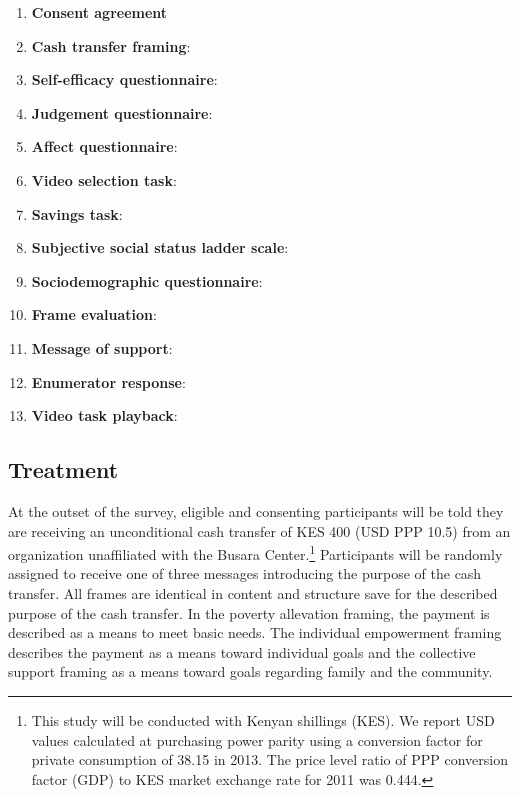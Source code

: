 \documentclass[11pt, a4paper]{article}\usepackage[]{graphicx}\usepackage[]{color}
\begin{document}
        \begin{enumerate}
            \item \textbf{Consent agreement}
            \item \textbf{Cash transfer framing}:
            \item \textbf{Self-efficacy questionnaire}:
            \item \textbf{Judgement questionnaire}:
            \item \textbf{Affect questionnaire}:
            \item \textbf{Video selection task}:
            \item \textbf{Savings task}:
            \item \textbf{Subjective social status ladder scale}:
            \item \textbf{Sociodemographic questionnaire}:
            \item \textbf{Frame evaluation}:
            \item \textbf{Message of support}:
            \item \textbf{Enumerator response}:
            \item \textbf{Video task playback}:
        \end{enumerate}

    \subsection{Treatment}

        At the outset of the survey, eligible and consenting participants will be told they are receiving an unconditional cash transfer of KES 400 (USD PPP 10.5) from an organization unaffiliated with the Busara Center.\footnote{This study will be conducted with Kenyan shillings (KES). We report USD values calculated at purchasing power parity using a conversion factor for private consumption of 38.15 in 2013. The price level ratio of PPP conversion factor (GDP) to KES market exchange rate for 2011 was 0.444.} Participants will be randomly assigned to receive one of three messages introducing the purpose of the cash transfer. All frames are identical in content and structure save for the described purpose of the cash transfer. In the poverty allevation framing, the payment is described as a means to meet basic needs. The individual empowerment framing describes the payment as a means toward individual goals and the collective support framing as a means toward goals regarding family and the community.
\end{document}
